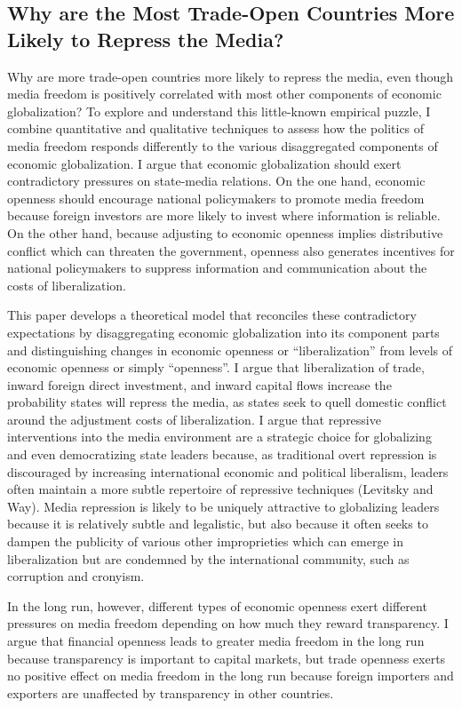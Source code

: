 \documentclass[12pt]{report}
\begin{document}
\subsection{Why are the Most Trade-Open Countries More Likely to Repress the Media?}

Why are more trade-open countries more likely to repress the media, even though media freedom is
positively correlated with most other components of economic globalization? To explore and
understand this little-known empirical puzzle, I combine quantitative and qualitative techniques to assess how the politics of media freedom responds differently to the various disaggregated components of economic globalization.
I argue that economic globalization should exert contradictory pressures on state-media relations. On the one hand, economic openness should encourage national policymakers to promote media freedom because foreign investors are more likely to invest where information is reliable. On the other hand, because adjusting to economic openness implies
distributive conflict which can threaten the government, openness also generates incentives for
national policymakers to suppress information and communication about the costs of liberalization.

This paper develops a theoretical model that reconciles these contradictory expectations by
disaggregating economic globalization into its component parts and distinguishing changes in economic openness
or ``liberalization'' from levels of economic openness or simply ``openness''. I argue that liberalization of
trade, inward foreign direct investment, and inward capital flows increase the probability states
will repress the media, as states seek to quell domestic conflict around the adjustment costs of
liberalization. I argue that repressive interventions into the media environment are a strategic choice for globalizing and even democratizing state leaders because, as traditional overt repression is discouraged by increasing international economic and political liberalism, leaders often maintain a more subtle repertoire of repressive techniques (Levitsky and Way). Media repression is likely to be uniquely attractive to globalizing leaders because it is relatively subtle and  legalistic, but also because it often seeks to dampen the publicity of various other improprieties which can emerge in liberalization but are condemned by the international community, such as corruption and cronyism.

In the long run, however, different types of economic openness exert different
pressures on media freedom depending on how much they reward transparency. I argue that financial
openness leads to greater media freedom in the long run because transparency is important to capital
markets, but trade openness exerts no positive effect on media freedom in the long run because
foreign importers and exporters are unaffected by transparency in other countries.
\end{document}
